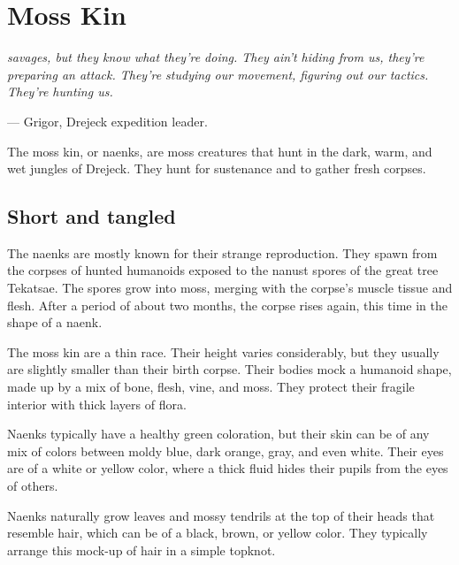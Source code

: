\section{Moss Kin}\label{src::naenk}
\begin{linenumbers}
\textit{savages, but they know what they're doing.
They ain't hiding from us, they're preparing an attack.
They're studying our movement, figuring out our tactics.
They're hunting us.}

\hspace*{\fill} --- Grigor, Drejeck expedition leader.

The moss kin, or naenks, are moss creatures that hunt in the dark, warm, and wet jungles of Drejeck.
They hunt for sustenance and to gather fresh corpses.

\subsection*{Short and tangled}
The naenks are mostly known for their strange reproduction.
They spawn from the corpses of hunted humanoids exposed to the nanust spores of the great tree Tekatsae.
The spores grow into moss, merging with the corpse's muscle tissue and flesh.
After a period of about two months, the corpse rises again, this time in the shape of a naenk.

The moss kin are a thin race.
Their height varies considerably, but they usually are slightly smaller than their birth corpse.
Their bodies mock a humanoid shape, made up by a mix of bone, flesh, vine, and moss.
They protect their fragile interior with thick layers of flora.

Naenks typically have a healthy green coloration, but their skin can be of any mix of colors between moldy blue, dark orange, gray, and even white.
Their eyes are of a white or yellow color, where a thick fluid hides their pupils from the eyes of others.

Naenks naturally grow leaves and mossy tendrils at the top of their heads that resemble hair, which can be of a black, brown, or yellow color.
They typically arrange this mock-up of hair in a simple topknot.



\end{linenumbers}
